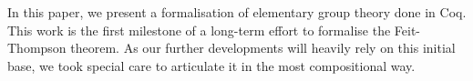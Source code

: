 In this paper, we present a formalisation of elementary group
theory done in {\sc Coq}. This work is the first milestone
of a long-term effort to formalise the Feit-Thompson theorem.
As our further developments will heavily rely on this initial base,
we took special care to articulate it in the most
compositional way.

